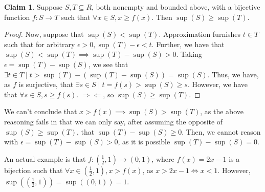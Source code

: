 \documentclass[12pt,letterpaper]{article}
\theoremstyle{definition}
\newtheorem*{claim}{Claim}
\newcommand{\contra}{\Rightarrow\!\Leftarrow}
\begin{document}
\begin{claim}
  Suppose $S,T \subseteq R$, both nonempty and bounded above, with a bijective
  function $f: S \rightarrow T$ such that $\forall x \in S, x \geq f(x)$. Then
  $\sup(S) \geq \sup(T)$.
\end{claim}




\begin{proof}
  Now, suppose that $\sup(S) < \sup(T)$. Approximation furnishes $t \in T$ such
  that for arbitrary $\epsilon > 0, \sup(T) - \epsilon < t$. Further, we have
  that $\sup(S) < \sup(T) \implies \sup(T) - \sup(S) > 0$. Taking $\epsilon
  = \sup(T) - \sup(S)$, we see that $\exists t \in T \mid t > \sup(T) - (\sup(T)
  - \sup(S)) = \sup(S)$. Thus, we have, as $f$ is surjective, that $\exists s \in S \mid t = f(s) > \sup(S)
  \geq s$. However, we have that $\forall s \in S, s \geq f(s)$. $\contra$, so
  $\sup(S) \geq \sup(T)$.
\end{proof}

We can't conclude that $x > f(x) \implies \sup(S) > \sup(T)$, as the above
reasoning fails in that we can only say, after assuming the opposite of
$\sup(S) \geq \sup(T)$, that $\sup(T) - \sup(S) \geq 0$. Then, we cannot
reason with $\epsilon = \sup(T) - \sup(S) > 0$, as it  is possible $\sup(T) -
\sup(S) = 0$.

An actual example is that $f: (\frac{1}{2},1) \rightarrow (0,1)$, where $f(x)
= 2x - 1$ is a bijection such that $\forall x \in (\frac{1}{2}, 1), x > f(x)$,
as $x > 2x - 1  \iff x < 1$. However, $\sup((\frac{1}{2}, 1)) = \sup((0,1)) = 1$.
  
\end{document}
